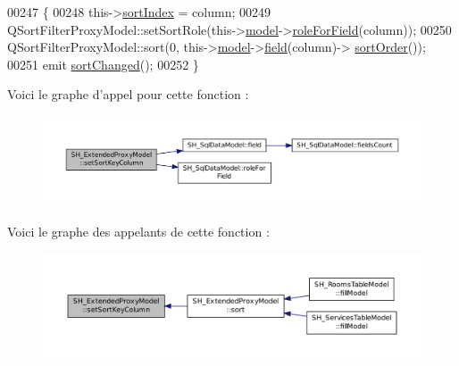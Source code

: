 \begin{DoxyCode}
00247 \{
00248     this->\hyperlink{classSH__ExtendedProxyModel_a83cabe4cf90a26d26c4aaa40e944b2bd}{sortIndex} = column;
00249     QSortFilterProxyModel::setSortRole(this->\hyperlink{classSH__ExtendedProxyModel_a8c8b8930c6b1abd9bbb1dce1fdc9690b}{model}->\hyperlink{classSH__SqlDataModel_aa487bb763eaf2544e4eb5822cd666105}{roleForField}(column));
00250     QSortFilterProxyModel::sort(0, this->\hyperlink{classSH__ExtendedProxyModel_a8c8b8930c6b1abd9bbb1dce1fdc9690b}{model}->\hyperlink{classSH__SqlDataModel_a92c51d5c1f6aca08a7ee566ece1e4cb6}{field}(column)->
      \hyperlink{classSH__SqlDataFields_a67b20d296535d6b9dda6c85f75427ad1}{sortOrder}());
00251     emit \hyperlink{classSH__ExtendedProxyModel_ad34f69425d6c86a2671cf9f85562a724}{sortChanged}();
00252 \}
\end{DoxyCode}


Voici le graphe d'appel pour cette fonction \-:\nopagebreak
\begin{figure}[H]
\begin{center}
\leavevmode
\includegraphics[width=350pt]{classSH__ExtendedProxyModel_ab8123244a5060aa35f5bce651046b99d_cgraph}
\end{center}
\end{figure}




Voici le graphe des appelants de cette fonction \-:\nopagebreak
\begin{figure}[H]
\begin{center}
\leavevmode
\includegraphics[width=350pt]{classSH__ExtendedProxyModel_ab8123244a5060aa35f5bce651046b99d_icgraph}
\end{center}
\end{figure}


